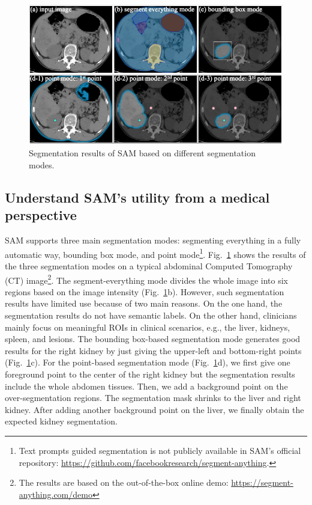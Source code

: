 \documentclass[runningheads]{llncs}
\begin{document}
\begin{figure}[h]
\centering
\includegraphics[scale=0.43]{imgs/fig2-SegModes.png}
\caption{Segmentation results of SAM based on different segmentation modes.}
\label{fig:sam-modes}
\end{figure}

\subsection{Understand SAM's utility from a medical perspective}
SAM supports three main segmentation modes: segmenting everything in a fully automatic way, bounding box mode, and point mode\footnote{Text prompts guided segmentation is not publicly available in SAM's official repository: \url{https://github.com/facebookresearch/segment-anything}.}. Fig.~\ref{fig:sam-modes} shows the results of the three segmentation modes on a typical abdominal Computed Tomography (CT) image\footnote{The results are based on the out-of-the-box online demo: \url{https://segment-anything.com/demo}}. The segment-everything mode divides the whole image into six regions based on the image intensity (Fig.~\ref{fig:sam-modes}b). However, such segmentation results have limited use because of two main reasons. On the one hand, the segmentation results do not have semantic labels.  On the other hand, clinicians mainly focus on meaningful ROIs in clinical scenarios, e.g., the liver, kidneys, spleen, and lesions. The bounding box-based segmentation mode generates good results for the right kidney by just giving the upper-left and bottom-right points (Fig.~\ref{fig:sam-modes}c). For the point-based segmentation mode (Fig.~\ref{fig:sam-modes}d), we first give one foreground point to the center of the right kidney but the segmentation results include the whole abdomen tissues. Then, we add a background point on the over-segmentation regions. The segmentation mask shrinks to the liver and right kidney. After adding another background point on the liver, we finally obtain the expected kidney segmentation.
\end{document}
